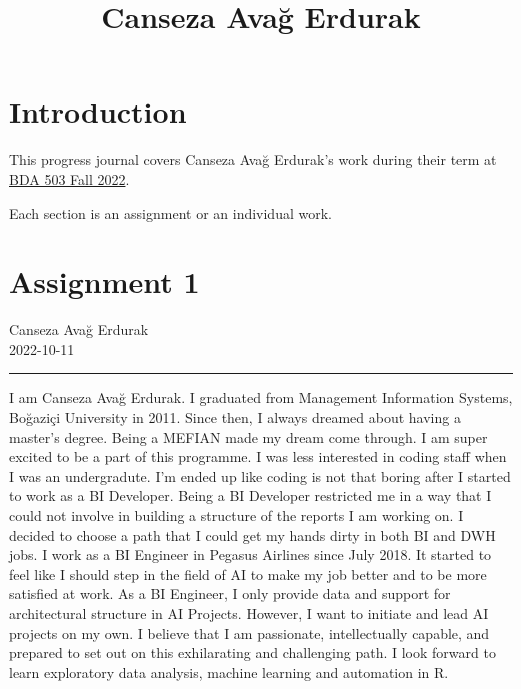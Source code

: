 \documentclass[
  letterpaper,
  DIV=11,
  numbers=noendperiod]{scrreprt}
\title{Canseza Avağ Erdurak}
\author{}
\date{}
\renewcommand*\contentsname{Table of contents}
\newcommand\contentsname{Table of contents}
\begin{document}
\maketitle
\ifdefined\Shaded\renewenvironment{Shaded}{\begin{tcolorbox}[sharp corners, borderline west={3pt}{0pt}{shadecolor}, interior hidden, enhanced, boxrule=0pt, frame hidden, breakable]}{\end{tcolorbox}}\fi

\renewcommand*\contentsname{Table of contents}
{
\hypersetup{linkcolor=}
\setcounter{tocdepth}{2}
\tableofcontents
}

\hypertarget{introduction}{%
\chapter*{Introduction}\label{introduction}}

This progress journal covers Canseza Avağ Erdurak's work during their
term at \href{https://mef-bda503.github.io/fall22/}{BDA 503 Fall 2022}.

Each section is an assignment or an individual work.


\hypertarget{assignment-1}{%
\chapter{Assignment 1}\label{assignment-1}}

Canseza Avağ Erdurak\\
2022-10-11

\hfill\break

\begin{center}\rule{0.5\linewidth}{0.5pt}\end{center}

I am Canseza Avağ Erdurak. I graduated from Management Information
Systems, Boğaziçi University in 2011. Since then, I always dreamed about
having a master's degree. Being a MEFIAN made my dream come through. I
am super excited to be a part of this programme. I was less interested
in coding staff when I was an undergradute. I'm ended up like coding is
not that boring after I started to work as a BI Developer. Being a BI
Developer restricted me in a way that I could not involve in building a
structure of the reports I am working on. I decided to choose a path
that I could get my hands dirty in both BI and DWH jobs. I work as a BI
Engineer in Pegasus Airlines since July 2018. It started to feel like I
should step in the field of AI to make my job better and to be more
satisfied at work. As a BI Engineer, I only provide data and support for
architectural structure in AI Projects. However, I want to initiate and
lead AI projects on my own. I believe that I am passionate,
intellectually capable, and prepared to set out on this exhilarating and
challenging path. I look forward to learn exploratory data analysis,
machine learning and automation in R.
\end{document}
